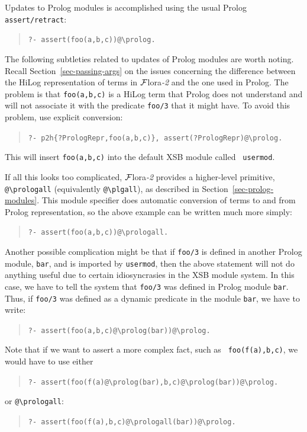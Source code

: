 \documentclass[11pt]{article}
\newcommand{\FLORA}{{\mbox{\sc ${\cal F}${lora}\rm\emph{-2}}}\xspace}
\newcommand{\FLSYSTEM}{\FLORA}
\newcommand{\bs}{\textbackslash}
\begin{document}
Updates to Prolog modules is accomplished using the usual
Prolog {\tt assert/retract}:
\begin{quote}
 {\tt ?- assert(foo(a,b,c))@\bs{}prolog.  }
\end{quote}
The following subtleties related to updates of Prolog modules are worth
noting. Recall Section~\ref{sec-passing-args} on the issues concerning the
difference between the HiLog representation of terms in \FLSYSTEM and the one
used in Prolog. The problem is that {\tt foo(a,b,c)} is a HiLog term that
Prolog does not understand and will not associate it with the predicate
{\tt foo/3} that it might have. To avoid this problem, use explicit conversion:
\begin{quote}
 {\tt ?- p2h\{?PrologRepr,foo(a,b,c)\}, assert(?PrologRepr)@\bs{}prolog.  }
\end{quote}
This will insert {\tt foo(a,b,c)} into the default XSB module called {\tt
  usermod}.

\index{"@\bs{}prologall}
\index{"@\bs{}plgall}
If all this looks too complicated, \FLSYSTEM provides a higher-level
primitive, {\tt @\bs{}prologall} (equivalently {\tt @\bs{}plgall}), as described in
Section~\ref{sec-prolog-modules}. This module specifier does automatic
conversion of terms to and from Prolog representation, so the above example
can be written much more simply:
\begin{quote}
 {\tt ?- assert(foo(a,b,c))@\bs{}prologall.  }  
\end{quote}

Another possible complication might be that
if {\tt foo/3} is defined in another Prolog module, {\tt bar}, and
is imported by {\tt usermod}, then the above statement will not do anything
useful due to certain idiosyncrasies in the XSB module system. In this
case, we have to tell the system that {\tt foo/3} was defined in Prolog
module {\tt bar}.  Thus, if
{\tt foo/3} was defined as a dynamic predicate in the module
  {\tt bar}, we have to write:
\begin{quote}
 {\tt ?- assert(foo(a,b,c)@\bs{}prolog(bar))@\bs{}prolog.  }  
\end{quote}
Note that if we want to assert a more complex fact, such as {\tt
  foo(f(a),b,c)}, we would have to use either
\begin{quote}
 {\tt ?- assert(foo(f(a)@\bs{}prolog(bar),b,c)@\bs{}prolog(bar))@\bs{}prolog.}  
\end{quote}
or {\tt @\bs{}prologall}:
\begin{quote}
 {\tt ?- assert(foo(f(a),b,c)@\bs{}prologall(bar))@\bs{}prolog.}  
\end{quote}
\end{document}
